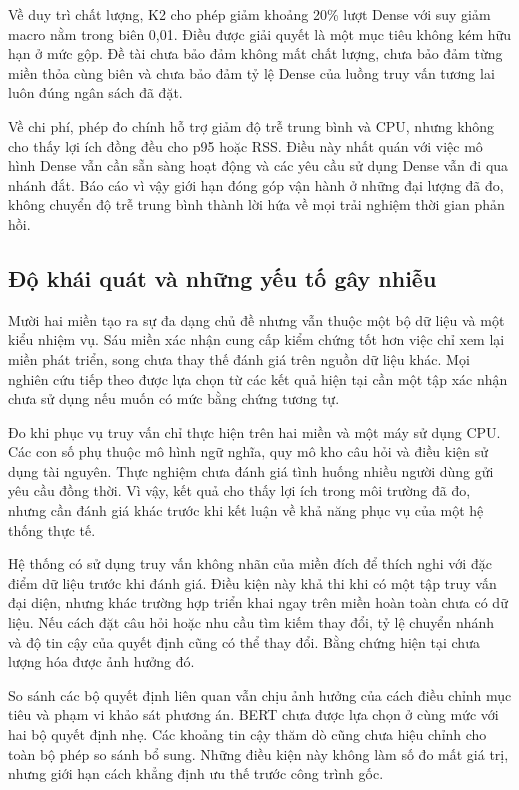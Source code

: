 Về duy trì chất lượng, K2 cho phép giảm khoảng 20\% lượt Dense với suy giảm macro nằm trong biên 0,01. Điều được giải quyết là một mục tiêu không kém hữu hạn ở mức gộp. Đề tài chưa bảo đảm không mất chất lượng, chưa bảo đảm từng miền thỏa cùng biên và chưa bảo đảm tỷ lệ Dense của luồng truy vấn tương lai luôn đúng ngân sách đã đặt.

Về chi phí, phép đo chính hỗ trợ giảm độ trễ trung bình và CPU, nhưng không cho thấy lợi ích đồng đều cho p95 hoặc RSS. Điều này nhất quán với việc mô hình Dense vẫn cần sẵn sàng hoạt động và các yêu cầu sử dụng Dense vẫn đi qua nhánh đắt. Báo cáo vì vậy giới hạn đóng góp vận hành ở những đại lượng đã đo, không chuyển độ trễ trung bình thành lời hứa về mọi trải nghiệm thời gian phản hồi.

\subsection{Độ khái quát và những yếu tố gây nhiễu}
Mười hai miền tạo ra sự đa dạng chủ đề nhưng vẫn thuộc một bộ dữ liệu và một kiểu nhiệm vụ. Sáu miền xác nhận cung cấp kiểm chứng tốt hơn việc chỉ xem lại miền phát triển, song chưa thay thế đánh giá trên nguồn dữ liệu khác. Mọi nghiên cứu tiếp theo được lựa chọn từ các kết quả hiện tại cần một tập xác nhận chưa sử dụng nếu muốn có mức bằng chứng tương tự.

Đo khi phục vụ truy vấn chỉ thực hiện trên hai miền và một máy sử dụng CPU. Các con số phụ thuộc mô hình ngữ nghĩa, quy mô kho câu hỏi và điều kiện sử dụng tài nguyên. Thực nghiệm chưa đánh giá tình huống nhiều người dùng gửi yêu cầu đồng thời. Vì vậy, kết quả cho thấy lợi ích trong môi trường đã đo, nhưng cần đánh giá khác trước khi kết luận về khả năng phục vụ của một hệ thống thực tế.

Hệ thống có sử dụng truy vấn không nhãn của miền đích để thích nghi với đặc điểm dữ liệu trước khi đánh giá. Điều kiện này khả thi khi có một tập truy vấn đại diện, nhưng khác trường hợp triển khai ngay trên miền hoàn toàn chưa có dữ liệu. Nếu cách đặt câu hỏi hoặc nhu cầu tìm kiếm thay đổi, tỷ lệ chuyển nhánh và độ tin cậy của quyết định cũng có thể thay đổi. Bằng chứng hiện tại chưa lượng hóa được ảnh hưởng đó.

So sánh các bộ quyết định liên quan vẫn chịu ảnh hưởng của cách điều chỉnh mục tiêu và phạm vi khảo sát phương án. BERT chưa được lựa chọn ở cùng mức với hai bộ quyết định nhẹ. Các khoảng tin cậy thăm dò cũng chưa hiệu chỉnh cho toàn bộ phép so sánh bổ sung. Những điều kiện này không làm số đo mất giá trị, nhưng giới hạn cách khẳng định ưu thế trước công trình gốc.



